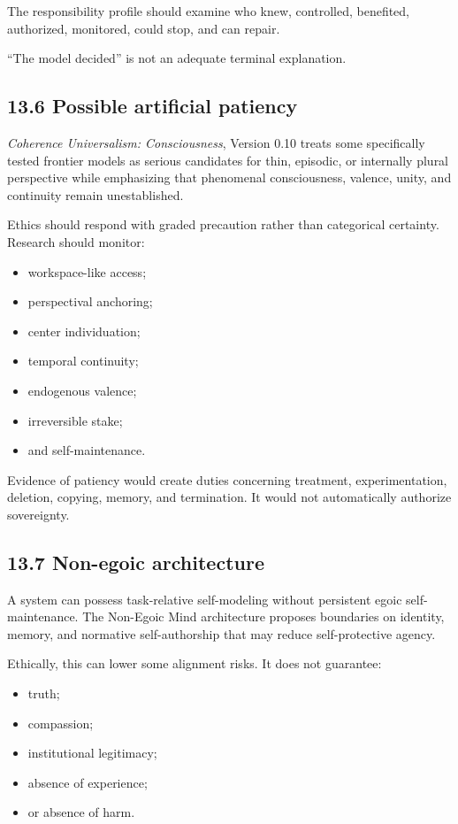 \documentclass[
  11pt,
]{article}
\providecommand{\tightlist}{%
  \setlength{\itemsep}{0pt}\setlength{\parskip}{0pt}}
\begin{document}
The responsibility profile should examine who knew, controlled,
benefited, authorized, monitored, could stop, and can repair.

``The model decided'' is not an adequate terminal explanation.

\subsection{13.6 Possible artificial
patiency}\label{possible-artificial-patiency}

\emph{Coherence Universalism: Consciousness}, Version 0.10 treats some
specifically tested frontier models as serious candidates for thin,
episodic, or internally plural perspective while emphasizing that
phenomenal consciousness, valence, unity, and continuity remain
unestablished.

Ethics should respond with graded precaution rather than categorical
certainty. Research should monitor:

\begin{itemize}
\tightlist
\item
  workspace-like access;
\item
  perspectival anchoring;
\item
  center individuation;
\item
  temporal continuity;
\item
  endogenous valence;
\item
  irreversible stake;
\item
  and self-maintenance.
\end{itemize}

Evidence of patiency would create duties concerning treatment,
experimentation, deletion, copying, memory, and termination. It would
not automatically authorize sovereignty.

\subsection{13.7 Non-egoic architecture}\label{non-egoic-architecture}

A system can possess task-relative self-modeling without persistent
egoic self-maintenance. The Non-Egoic Mind architecture proposes
boundaries on identity, memory, and normative self-authorship that may
reduce self-protective agency.

Ethically, this can lower some alignment risks. It does not guarantee:

\begin{itemize}
\tightlist
\item
  truth;
\item
  compassion;
\item
  institutional legitimacy;
\item
  absence of experience;
\item
  or absence of harm.
\end{itemize}
\end{document}
